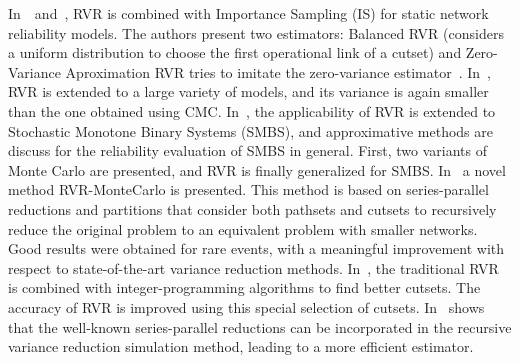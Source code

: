 In~\cite{78}~and~\cite{84}, RVR is combined with Importance Sampling (IS) for static network reliability models. 
The authors present two estimators: Balanced RVR (considers a uniform distribution to choose the first operational link of a cutset) and Zero-Variance Aproximation RVR tries to imitate the zero-variance estimator~\cite{79}. In~\cite{81,83}, RVR is extended to a large variety of models,  and its variance is again smaller than the one obtained using CMC. In~\cite{82}, the applicability of RVR is extended to Stochastic Monotone Binary Systems (SMBS), and approximative methods are discuss for the reliability evaluation of SMBS in general. First, two variants of Monte Carlo are presented, and RVR is finally generalized for SMBS. In~\cite{85} a novel method RVR-MonteCarlo is presented. This method is based on series-parallel reductions and partitions that consider both pathsets and cutsets to recursively reduce the original problem to an equivalent problem with smaller networks. Good results were obtained for rare events, with a meaningful improvement with respect to state-of-the-art variance reduction methods. In~\cite{86}, the traditional RVR is combined with integer-programming algorithms to find better cutsets. The accuracy of RVR is improved using this special selection of cutsets. In~\cite{12} shows that the well-known series-parallel reductions can be incorporated in the recursive variance reduction simulation method, leading to a more efficient estimator.
%
